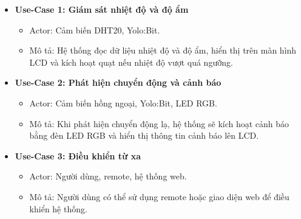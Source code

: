 \begin{itemize}
    \item \textbf{Use-Case 1: Giám sát nhiệt độ và độ ẩm}
          \begin{itemize}
              \item Actor: Cảm biến DHT20, Yolo:Bit.
              \item Mô tả: Hệ thống đọc dữ liệu nhiệt độ và độ ẩm, hiển thị trên màn hình LCD và kích hoạt quạt nếu nhiệt độ vượt quá ngưỡng.
          \end{itemize}
    \item \textbf{Use-Case 2: Phát hiện chuyển động và cảnh báo}
          \begin{itemize}
              \item Actor: Cảm biến hồng ngoại, Yolo:Bit, LED RGB.
              \item Mô tả: Khi phát hiện chuyển động lạ, hệ thống sẽ kích hoạt cảnh báo bằng đèn LED RGB và hiển thị thông tin cảnh báo lên LCD.
          \end{itemize}
    \item \textbf{Use-Case 3: Điều khiển từ xa}
          \begin{itemize}
              \item Actor: Người dùng, remote, hệ thống web.
              \item Mô tả: Người dùng có thể sử dụng remote hoặc giao diện web để điều khiển hệ thống.
          \end{itemize}

\end{itemize}

\begin{minipage}{0.48\textwidth}
    \begin{center}
    \end{center}
\end{minipage}
\hfill
\begin{minipage}{0.48\textwidth}
    \begin{center}
    \end{center}
\end{minipage}
